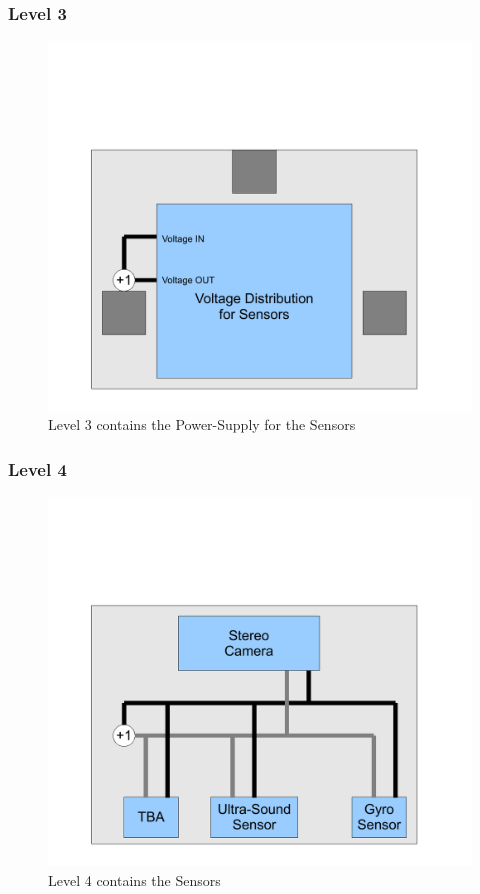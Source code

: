 \documentclass{beamer}
\begin{document}
\begin{frame}
	\frametitle{Level 3}
	\begin{figure}
	\includegraphics[scale=0.4]{figures/level3.pdf}
	\caption{Level 3 contains the Power-Supply for the Sensors}
	\end{figure}
\end{frame}

\begin{frame}
	\frametitle{Level 4}
	\begin{figure}
	\includegraphics[scale=0.4]{figures/level4.pdf}
	\caption{Level 4 contains the Sensors}
	\end{figure}
\end{frame}
\end{document}

